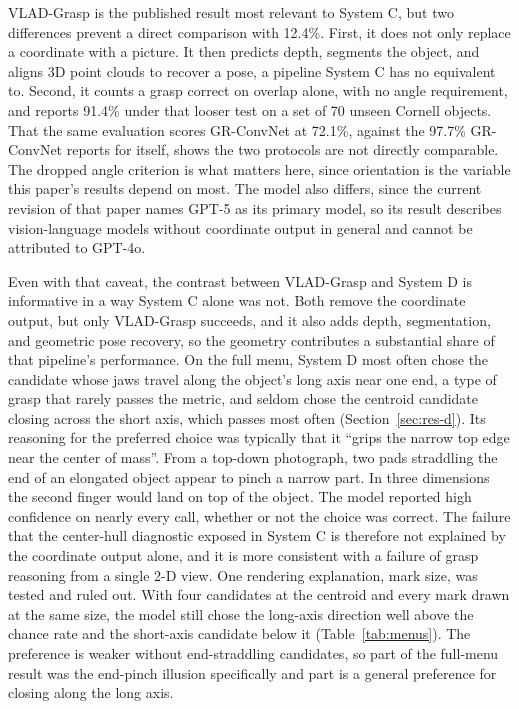 \documentclass[12pt,letterpaper]{article}
\begin{document}
VLAD-Grasp is the published result most relevant to System C, but two
differences prevent a direct comparison with 12.4\%. First, it does not
only replace a coordinate with a picture. It then predicts depth,
segments the object, and aligns 3D point clouds to recover a pose, a
pipeline System C has no equivalent to. Second, it counts a grasp
correct on overlap alone, with no angle requirement, and reports 91.4\%
under that looser test on a set of 70 unseen Cornell objects. That the
same evaluation scores GR-ConvNet at 72.1\%, against the 97.7\%
GR-ConvNet reports for itself, shows the two protocols are not directly
comparable. The dropped angle criterion is what matters here, since
orientation is the variable this paper's results depend on most. The
model also differs, since the current revision of that paper names GPT-5
as its primary model, so its result describes vision-language models
without coordinate output in general and cannot be attributed to GPT-4o.

Even with that caveat, the contrast between VLAD-Grasp and System D is
informative in a way System C alone was not. Both remove the coordinate
output, but only VLAD-Grasp succeeds, and it also adds depth,
segmentation, and geometric pose recovery, so the geometry contributes a
substantial share of that pipeline's performance. On the full menu, System D most often chose the candidate whose jaws travel along the
object's long axis near one end, a type of grasp that rarely passes the
metric, and seldom chose the centroid candidate closing across the short
axis, which passes most often (Section~\ref{sec:res-d}). Its reasoning
for the preferred choice was typically that it ``grips the narrow top
edge near the center of mass''. From a top-down photograph, two pads
straddling the end of an elongated object appear to pinch a narrow part.
In three dimensions the second finger would land on top of the object.
The model reported high confidence on nearly every call, whether or not
the choice was correct. The failure that the center-hull diagnostic
exposed in System C is therefore not explained by the coordinate output
alone, and it is more consistent with a failure of grasp reasoning from
a single 2-D view. One rendering explanation, mark size, was tested and
ruled out. With four candidates at the centroid and every mark drawn at
the same size, the model still chose the long-axis direction well above
the chance rate and the short-axis candidate below it
(Table~\ref{tab:menus}). The preference is weaker without end-straddling
candidates, so part of the full-menu result was the end-pinch illusion
specifically and part is a general preference for closing along the long
axis.
\end{document}
